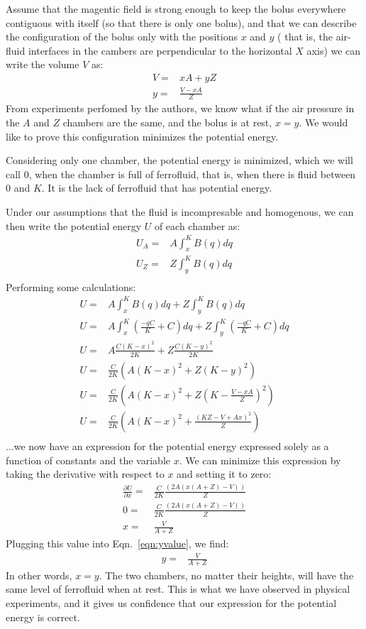 \documentclass{asme2ej}
\begin{document}
Assume that the magentic field is strong enough to keep the bolus everywhere
contiguous with itself (so that there is only one bolus), and that we can
describe the configuration of the bolus only with the positions $x$ and $y$ (
that is, the air-fluid interfaces in the cambers are perpendicular to the horizontal $X$ axis)
we can write the
volume $V$ as:
\begin{align}
  V = & xA + yZ \\
  y = & \frac{V - xA}{Z}
  \label{eqn:yvalue}
\end{align}
From experiments perfomed by the authors, we know what if the air pressure in
the $A$ and $Z$ chambers are the same, and the bolus is at rest, $x = y$.
We would like to prove this configuration minimizes the potential energy.

Considering only one chamber, the potential energy is minimized, which
we will call $0$, when the chamber is full of ferrofluid, that is, when
there is fluid between 0 and $K$. It is the lack of ferrofluid that has
potential energy.

Under our assumptions that the fluid is incompresable and homogenous,
we can then write the potential energy $U$ of each chamber as:
\begin{align}
  U_A = &A \int_x^K B(q) dq \\
  U_Z = &Z \int_y^K B(q) dq \\
\end{align}
Performing some calculations:
\begin{align}
  U = &A \int_x^K B(q) dq + Z \int_y^K B(q) dq \\
  U = &A \int_x^K (\frac{-qC}{K} + C) dq + Z \int_y^K (\frac{-qC}{K} + C) dq \\
  U = &A \frac{C (K - x)^2}{2 K} + Z \frac{C (K - y)^2}{2 K} \\
  U = & \frac{C}{2K} \left( A  (K - x)^2 + Z (K - y)^2 \right) \\
  U = & \frac{C}{2K} \left( A  (K - x)^2 + Z (K - \frac{V - xA}{Z})^2 \right) \\
  U = & \frac{C}{2K} \left( A  (K - x)^2 + \frac{(K Z - V + A x)^2}{Z} \right) \\
\end{align}
...we now have an expression for the potential energy expressed solely as a function of constants
and the variable $x$. We can minimize this expression by taking the derivative with respect
to $x$ and setting it to zero:
\begin{align}
  \frac{\partial U}{\partial x} = & \frac{C}{2K} \frac{(2 A (x (A + Z) - V))}{Z} \\
  0 = & \frac{C}{2K} \frac{(2 A (x (A + Z) - V))}{Z} \\
  x = & \frac{V}{A + Z}
\end{align}
Plugging this value into Eqn.~\ref{eqn:yvalue}, we find:
\begin{align}
  y = & \frac{V}{A + Z}
\end{align}
In other words, $x = y$. The two chambers, no matter their heights, will have
the same level of ferrofluid when at rest. This is what we have observed in
physical experiments, and it gives us confidence that our expression for the
potential energy is correct.
\end{document}
